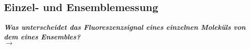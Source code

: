 \subsection{\label{subsec:FZV4}Einzel- und Ensemblemessung}
\textbf{\textit{Was unterscheidet das Fluoreszenzsignal eines einzelnen Moleküls von dem eines Ensembles?}} \\
$\rightarrow$